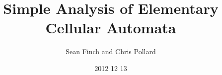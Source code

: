\documentclass{article}
\author{Sean Finch and Chris Pollard}
\date{2012 12 13}
\title{Simple Analysis of Elementary Cellular Automata}
\begin{document}
\maketitle

\vspace{3in}

\begin{abstract}
\end{abstract}

\newpage









\end{document}
